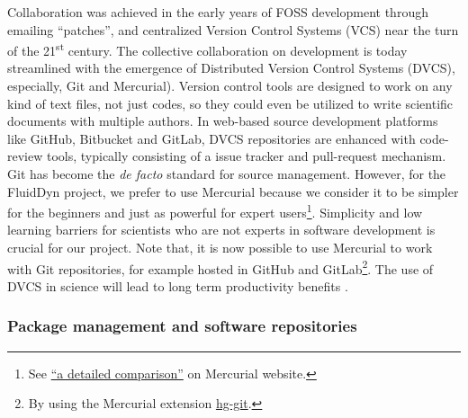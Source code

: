Collaboration was achieved in the early years of FOSS development through
emailing ``patches'', and centralized Version Control Systems (VCS) near the
turn of the 21\textsuperscript{st} century.  The collective collaboration on
development is today streamlined with the emergence of Distributed Version
Control Systems (DVCS), especially, Git and Mercurial).
%
Version control tools are designed to work on any kind of text files, not just
codes, so they could even be utilized to write scientific documents with
multiple authors.
%
In web-based source development platforms like GitHub, Bitbucket and GitLab,
DVCS repositories are enhanced with code-review tools, typically consisting of
a issue tracker and pull-request mechanism.
%
Git has become the \textit{de facto} standard for source management. However,
for the FluidDyn project, we prefer to use Mercurial because we consider it to
be simpler for the beginners and just as powerful for expert users\footnote{See
  \href{https://www.mercurial-scm.org/wiki/GitConcepts}{``a detailed
comparison''} on Mercurial website.}. Simplicity and low learning barriers for
scientists who are not experts in software development is crucial for our
project.
%
Note that, it is now possible to use Mercurial to work with Git repositories,
for example hosted in GitHub and GitLab\footnote{By using the Mercurial
extension \href{http://hg-git.github.io/}{hg-git}.}.
%
The use of DVCS in science will lead to long term productivity benefits
\citep{wilson_best_2014}.


\subsubsection{Package management and software repositories}

